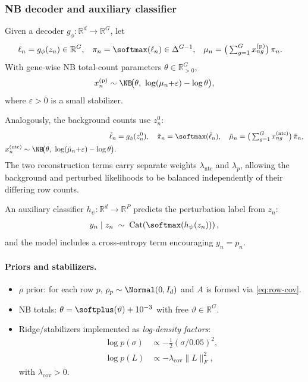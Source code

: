 \subsubsection{NB decoder and auxiliary classifier}
Given a decoder $g_\phi:\mathbb{R}^d \to \mathbb{R}^G$, let
\begin{align}
  \ell_n &= g_\phi(z_n)\in\mathbb{R}^G, &
  \pi_n &= \softmax(\ell_n)\in\Delta^{G-1}, &
  \mu_n &= \big(\textstyle\sum_{g=1}^G x^{(\mathrm{p})}_{ng}\big)\,\pi_n.
\end{align}
With gene-wise NB total-count parameters $\theta \in \mathbb{R}^G_{>0}$,
\begin{align}
  x^{(\mathrm{p})}_n \sim \NB\!\big(\theta,\ \log(\mu_n{+}\varepsilon)-\log\theta\big),
\end{align}
where $\varepsilon>0$ is a small stabilizer.

Analogously, the background counts use $z^0_n$:
\begin{align}
  \tilde{\ell}_n &= g_\phi(z^0_n),\quad
  \tilde{\pi}_n = \softmax(\tilde{\ell}_n),\quad
  \tilde{\mu}_n = \big(\textstyle\sum_{g=1}^G x^{(\mathrm{ntc})}_{ng}\big)\,\tilde{\pi}_n, \\
  x^{(\mathrm{ntc})}_n \sim \NB\!\big(\theta,\ \log(\tilde{\mu}_n{+}\varepsilon)-\log\theta\big).
\end{align}
The two reconstruction terms carry separate weights $\lambda_{\mathrm{ntc}}$ and $\lambda_{p}$,
allowing the background and perturbed likelihoods to be balanced independently of their differing
row counts.

An auxiliary classifier $h_\psi:\mathbb{R}^d\to\mathbb{R}^P$ predicts the perturbation label from
$z_n$:
\begin{align}
  y_n \mid z_n \;\sim\; \mathrm{Cat}\!\left(\softmax(h_\psi(z_n))\right),
\end{align}
and the model includes a cross-entropy term encouraging $y_n=p_n$.

\paragraph{Priors and stabilizers.}
\begin{itemize}
\item $\rho$ prior: for each row $p$, $\rho_p \sim \Normal(0,I_d)$ and $A$ is formed via
\eqref{eq:row-cov}.
\item NB totals: $\theta=\softplus(\vartheta)+10^{-3}$ with free $\vartheta\in\mathbb{R}^G$.
\item Ridge/stabilizers implemented as \emph{log-density factors}:
  \begin{align}
    \log p(\sigma) &\propto -\tfrac12 (\sigma/0.05)^2, \\
    \log p(L) &\propto -\lambda_{\mathrm{cov}}\|L\|_F^2,
  \end{align}
  with $\lambda_{\mathrm{cov}}>0$.
\end{itemize}

